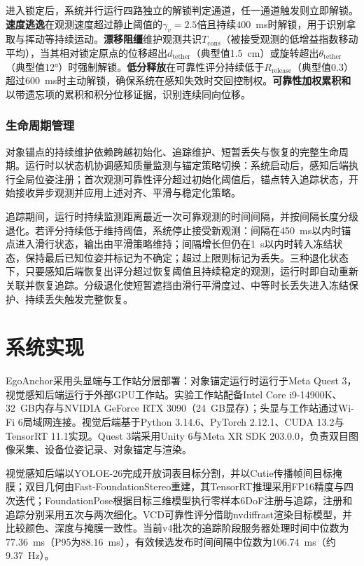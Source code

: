 \documentclass[review]{vgtc}
\begin{document}
进入锁定后，系统并行运行四路独立的解锁判定通道，任一通道触发则立即解锁。\textbf{速度逃逸}在观测速度超过静止阈值的$\gamma_v = 2.5$倍且持续400~ms时解锁，用于识别拿取与挥动等持续运动。\textbf{漂移阻缰}维护观测共识$T_{\mathrm{cons}}$（被接受观测的低增益指数移动平均），当其相对锁定原点的位移超出$d_{\mathrm{tether}}$（典型值1.5~cm）或旋转超出$\theta_{\mathrm{tether}}$（典型值12°）时强制解锁。\textbf{低分释放}在可靠性评分持续低于$R_{\mathrm{release}}$（典型值0.3）超过600~ms时主动解锁，确保系统在感知失效时交回控制权。\textbf{可靠性加权累积和}以带遗忘项的累积和积分位移证据，识别连续同向位移。

\subsubsection{生命周期管理}\label{sec:lifecycle}

对象锚点的持续维护依赖跨越初始化、追踪维护、短暂丢失与恢复的完整生命周期。运行时以状态机协调感知质量监测与锚定策略切换：系统启动后，感知后端执行全局位姿注册；首次观测可靠性评分超过初始化阈值后，锚点转入追踪状态，开始接收异步观测并应用上述对齐、平滑与稳定化策略。

追踪期间，运行时持续监测距离最近一次可靠观测的时间间隔，并按间隔长度分级退化。若评分持续低于维持阈值，系统停止接受新观测：间隔在450~ms以内时锚点进入滑行状态，输出由平滑策略维持；间隔增长但仍在1~s以内时转入冻结状态，保持最后已知位姿并标记为不确定；超过上限则标记为丢失。三种退化状态下，只要感知后端恢复出评分超过恢复阈值且持续稳定的观测，运行时即自动重新关联并恢复追踪。分级退化使短暂遮挡由滑行平滑度过、中等时长丢失进入冻结保护、持续丢失触发完整恢复。

\section{系统实现}\label{sec:implementation}

EgoAnchor采用头显端与工作站分层部署：对象锚定运行时运行于Meta Quest 3，视觉感知后端运行于外部GPU工作站。实验工作站配备Intel Core i9-14900K、32~GB内存与NVIDIA GeForce RTX 3090（24~GB显存）；头显与工作站通过Wi-Fi 6局域网连接。视觉后端基于Python 3.14.6、PyTorch 2.12.1、CUDA 13.2与TensorRT 11.1实现。Quest 3端采用Unity 6与Meta XR SDK 203.0.0，负责双目图像采集、设备位姿记录、对象锚定与渲染。

视觉感知后端以YOLOE-26完成开放词表目标分割，并以Cutie传播帧间目标掩膜；双目几何由Fast-FoundationStereo重建，其TensorRT推理采用FP16精度与四次迭代；FoundationPose根据目标三维模型执行零样本6DoF注册与追踪，注册和追踪分别采用五次与两次细化。VCD可靠性评分借助nvdiffrast渲染目标模型，并比较颜色、深度与掩膜一致性。当前v4批次的追踪阶段服务器处理时间中位数为77.36~ms（P95为88.16~ms），有效候选发布时间间隔中位数为106.74~ms（约9.37~Hz）。
\end{document}
